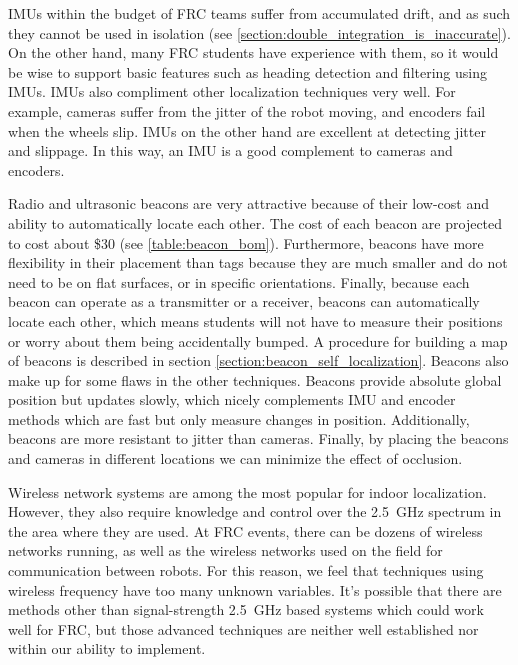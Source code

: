 \documentclass{article}
\begin{document}
  IMUs within the budget of FRC teams suffer from accumulated drift, and as such they cannot be used in isolation (see \ref{section:double_integration_is_inaccurate}). On the other hand, many FRC students have experience with them, so it would be wise to support basic features such as heading detection and filtering using IMUs. IMUs also compliment other localization techniques very well. For example, cameras suffer from the jitter of the robot moving, and encoders fail when the wheels slip. IMUs on the other hand are excellent at detecting jitter and slippage. In this way, an IMU is a good complement to cameras and encoders.

  Radio and ultrasonic beacons are very attractive because of their low-cost and ability to automatically locate each other. The cost of each beacon are projected to cost about \$30 (see \ref{table:beacon_bom}). Furthermore, beacons have more flexibility in their placement than tags because they are much smaller and do not need to be on flat surfaces, or in specific orientations. Finally, because each beacon can operate as a transmitter or a receiver, beacons can automatically locate each other, which means students will not have to measure their positions or worry about them being accidentally bumped. A procedure for building a map of beacons is described in section \ref{section:beacon_self_localization}. Beacons also make up for some flaws in the other techniques. Beacons provide absolute global position but updates slowly, which nicely complements IMU and encoder methods which are fast but only measure changes in position. Additionally, beacons are more resistant to jitter than cameras. Finally, by placing the beacons and cameras in different locations we can minimize the effect of occlusion.

  Wireless network systems are among the most popular for indoor localization. However, they also require knowledge and control over the \SI{2.5}{\giga\hertz} spectrum in the area where they are used. At FRC events, there can be dozens of wireless networks running, as well as the wireless networks used on the field for communication between robots. For this reason, we feel that techniques using wireless frequency have too many unknown variables. It's possible that there are methods other than signal-strength \SI{2.5}{\giga\hertz} based systems which could work well for FRC, but those advanced techniques are neither well established nor within our ability to implement.
\end{document}
